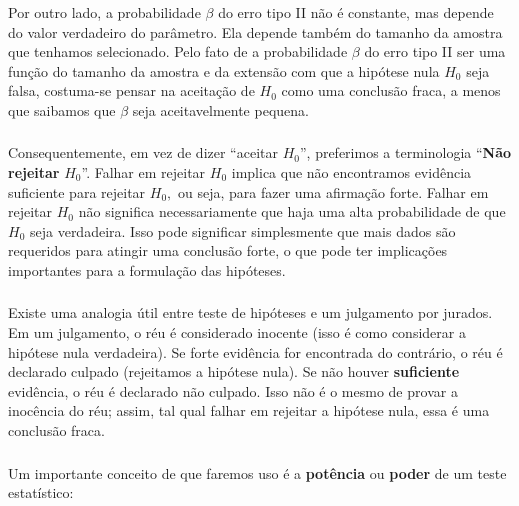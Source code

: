 \documentclass[14pt,aspectratio=1610]{beamer}
\newcommand{\Ho}{\ensuremath{H_{0}}}
\begin{document}
\begin{frame}{}
\frametitle{}
\begin{block}{}
\justifying
Por outro lado, a probabilidade $\beta$ do erro tipo II não é constante, mas depende do valor verdadeiro do parâmetro. Ela depende também do tamanho da amostra 
que tenhamos selecionado. Pelo fato de a probabilidade $\beta$ do erro tipo II ser uma função do tamanho da amostra e da extensão com que a hipótese nula $\Ho$ 
seja falsa, costuma-se pensar na aceitação de $\Ho$ como uma conclusão fraca, a menos que saibamos que $\beta$ seja aceitavelmente pequena. 
\end{block}
\end{frame}

\begin{frame}{}
\frametitle{}
\begin{block}{}
\justifying
Consequentemente, em vez de dizer ``aceitar $\Ho$'', preferimos a terminologia ``\textbf{Não rejeitar }$\Ho$''. Falhar em rejeitar $\Ho$ implica que não encontramos evidência 
suficiente para rejeitar $\Ho,$ ou seja, para fazer uma afirmação forte. Falhar em rejeitar $\Ho$ não significa necessariamente que haja uma alta probabilidade de que 
$\Ho$ seja verdadeira. Isso pode significar simplesmente que mais dados são requeridos para atingir uma conclusão forte, o que pode ter implicações importantes para 
a formulação das hipóteses.
\end{block}
\end{frame}

\begin{frame}{}
\frametitle{}
\begin{block}{}
\justifying
Existe uma analogia útil entre teste de hipóteses e um julgamento por jurados. Em um julgamento, o réu é considerado inocente (isso é como considerar a hipótese 
nula verdadeira). Se forte evidência for encontrada do contrário, o réu é declarado culpado (rejeitamos a hipótese nula). Se não houver \textbf{suficiente} evidência, o réu é 
declarado não culpado. Isso não é o mesmo de provar a inocência do réu; assim, tal qual falhar em rejeitar a hipótese nula, essa é uma conclusão fraca.
\end{block}
\end{frame}

\begin{frame}{}
\frametitle{}
\begin{block}{}
\justifying
Um importante conceito de que faremos uso é a \textbf{potência} ou \textbf{poder} de um teste estatístico:
\end{block}
\end{frame}
\end{document}
